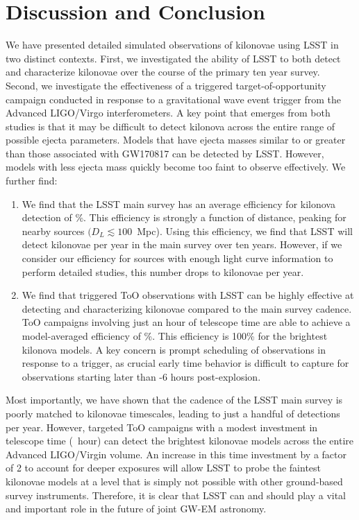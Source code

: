 \section{Discussion and Conclusion}
\label{sec:ch6_conc}
We have presented detailed simulated observations of kilonovae using LSST in two distinct contexts. First, we investigated the ability of LSST to both detect and characterize kilonovae over the course of the primary ten year survey. Second, we investigate the effectiveness of a triggered target-of-opportunity campaign conducted in response to a gravitational wave event trigger from the Advanced LIGO/Virgo interferometers. A key point that emerges from both studies is that it may be difficult to detect kilonova across the entire range of possible ejecta parameters. Models that have ejecta masses similar to or greater than those associated with GW170817 can be detected by LSST. However, models with less ejecta mass quickly become too faint to observe effectively. We further find:

\begin{enumerate}
\item We find that the LSST main survey has an average efficiency for kilonova detection of \%. This efficiency is strongly a function of distance, peaking for nearby sources $(D_L \lesssim 100$~Mpc). Using this efficiency, we find that LSST will detect  kilonovae per year in the main survey over ten years. However, if we consider our efficiency for sources with enough light curve information to perform detailed studies, this number drops to  kilonovae per year.
\item We find that triggered ToO observations with LSST can be highly effective at detecting and characterizing kilonovae compared to the main survey cadence. ToO campaigns involving just an hour of telescope time are able to achieve a model-averaged efficiency of \%. This efficiency is 100\% for the brightest kilonova models. A key concern is prompt scheduling of observations in response to a trigger, as crucial early time behavior is difficult to capture for observations starting later than -6 hours post-explosion.
\end{enumerate}

Most importantly, we have shown that the cadence of the LSST main survey is poorly matched to kilonovae timescales, leading to just a handful of detections per year. However, targeted ToO campaigns with a modest investment in telescope time (~hour) can detect the brightest kilonovae models across the entire Advanced LIGO/Virgin volume. An increase in this time investment by a factor of 2 to account for deeper exposures will allow LSST to probe the faintest kilonovae models at a level that is simply not possible with other ground-based survey instruments. Therefore, it is clear that LSST can and should play a vital and important role in the future of joint GW-EM astronomy. 
